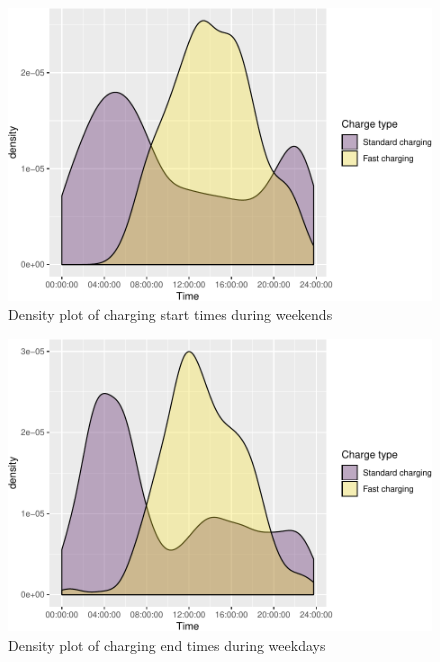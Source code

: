 \documentclass[]{article}
\begin{document}
\begin{figure}
\centering
\includegraphics{EVBB_report_files/figure-latex/chargeBeginsWeekend-1.pdf}
\caption{\label{fig:chargeBeginsWeekend}Density plot of charging start times
during weekends}
\end{figure}

\begin{figure}
\centering
\includegraphics{EVBB_report_files/figure-latex/chargeEndsWeekday-1.pdf}
\caption{\label{fig:chargeEndsWeekday}Density plot of charging end times
during weekdays}
\end{figure}
\end{document}
